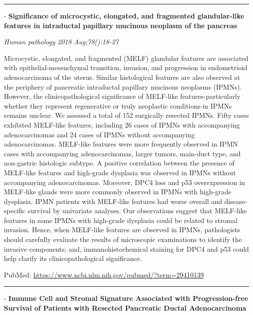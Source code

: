 \documentclass[]{article}
\begin{document}
\begin{center}\rule{0.5\linewidth}{\linethickness}\end{center}

 - \textbf{Significance of microcystic, elongated, and fragmented
glandular-like features in intraductal papillary mucinous neoplasm of
the pancreas}

\emph{Human pathology 2018 Aug;78():18-27}

Microcystic, elongated, and fragmented (MELF) glandular features are
associated with epithelial-mesenchymal transition, invasion, and
progression in endometrioid adenocarcinoma of the uterus. Similar
histological features are also observed at the periphery of pancreatic
intraductal papillary mucinous neoplasms (IPMNs). However, the
clinicopathological significance of MELF-like features-particularly
whether they represent regenerative or truly neoplastic conditions-in
IPMNs remains unclear. We assessed a total of 152 surgically resected
IPMNs. Fifty cases exhibited MELF-like features, including 26 cases of
IPMNs with accompanying adenocarcinomas and 24 cases of IPMNs without
accompanying adenocarcinomas. MELF-like features were more frequently
observed in IPMN cases with accompanying adenocarcinomas, larger tumors,
main-duct type, and non-gastric histologic subtype. A positive
correlation between the presence of MELF-like features and high-grade
dysplasia was observed in IPMNs without accompanying adenocarcinomas.
Moreover, DPC4 loss and p53 overexpression in MELF-like glands were more
commonly observed in IPMNs with high-grade dysplasia. IPMN patients with
MELF-like features had worse overall and disease-specific survival by
univariate analyses. Our observations suggest that MELF-like features in
some IPMNs with high-grade dysplasia could be related to stromal
invasion. Hence, when MELF-like features are observed in IPMNs,
pathologists should carefully evaluate the results of microscopic
examinations to identify the invasive components; and,
immunohistochemical staining for DPC4 and p53 could help clarify its
clinicopathological significance.

PubMed: \url{https://www.ncbi.nlm.nih.gov/pubmed/?term=29410139}

{}

{}

\begin{center}\rule{0.5\linewidth}{\linethickness}\end{center}

 - \textbf{Immune Cell and Stromal Signature Associated with
Progression-free Survival of Patients with Resected Pancreatic Ductal
Adenocarcinoma}
\end{document}
